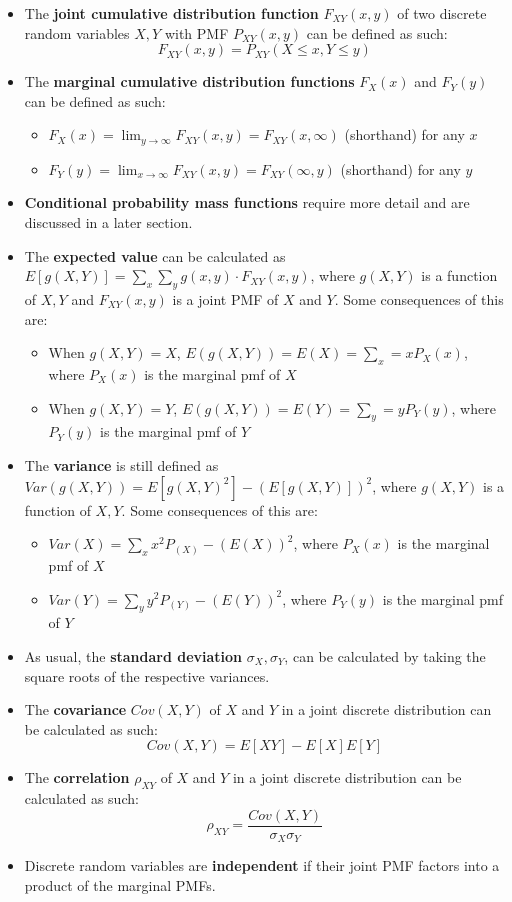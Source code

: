 \documentclass[12pt]{article}
\begin{document}
\begin{itemize}
	\item The \textbf{joint cumulative distribution function} $F_{XY}(x, y)$ of
	      two discrete random variables $X, Y$ with PMF $P_{XY}(x, y)$ can be defined as such:
	      \[
		      F_{XY}(x, y) = P_{XY}(X \leq x, Y \leq y)
	      \]
	\item The \textbf{marginal cumulative distribution functions} $F_X(x)$ and $F_Y(y)$ can be defined as such:
	      \begin{itemize}
		      \item $F_X(x) = \lim_{y\to\infty}F_{XY}(x, y) = F_{XY} (x, \infty)$ (shorthand) for any $x$
		      \item $F_Y(y) = \lim_{x\to\infty}F_{XY}(x, y) = F_{XY} (\infty, y)$ (shorthand) for any $y$
	      \end{itemize}
	\item \textbf{Conditional probability mass functions} require more detail and are discussed in a later section.
	\item The \textbf{expected value} can be calculated as $E[g(X, Y)] = \displaystyle\sum_{x}
		      \displaystyle\sum_{y} g(x, y) \cdot F_{XY}(x, y)$, where $g(X, Y)$ is a
	      function of $X, Y$ and $F_{XY}(x, y)$ is a joint PMF of $X$ and $Y$. Some consequences of this are:
	      \begin{itemize}
		      \item When $g(X, Y) = X$, $E(g(X, Y)) = E(X) = \displaystyle\sum_{x} = x P_X(x)$, where $P_X(x)$ is the marginal pmf of $X$
		      \item When $g(X, Y) = Y$, $E(g(X, Y)) = E(Y) = \displaystyle\sum_{y} = y P_Y(y)$, where $P_Y(y)$ is the marginal pmf of $Y$
	      \end{itemize}
	\item The \textbf{variance} is still defined as $Var(g(X, Y)) = E[g(X,
				      Y)^2] - (E[g(X, Y)])^2$, where $g(X, Y)$ is a function of $X, Y$. Some
	      consequences of this are:
	      \begin{itemize}
		      \item $Var(X) = \displaystyle\sum_{x} x^2 P_(X) - (E(X))^2$, where $P_X(x)$ is the marginal pmf of $X$
		      \item $Var(Y) = \displaystyle\sum_{y} y^2 P_(Y) - (E(Y))^2$, where $P_Y(y)$ is the marginal pmf of $Y$
	      \end{itemize}
	\item As usual, the \textbf{standard deviation} $\sigma_X, \sigma_Y$,
	      can be calculated by taking the square roots of the respective
	      variances.
	\item The \textbf{covariance} $Cov(X, Y)$ of $X$ and $Y$ in a joint discrete distribution can be calculated as such:
	      \[
		      Cov(X, Y) = E[XY] - E[X]E[Y]
	      \]
	\item The \textbf{correlation} $\rho_{XY}$ of $X$ and $Y$ in a joint discrete distribution can be calculated as such:
	      \[
		      \rho_{XY} = \frac{Cov(X, Y)}{\sigma_X \sigma_Y}
	      \]
	\item Discrete random variables are \textbf{independent} if their joint PMF factors into a product of the marginal PMFs.
\end{itemize}
\end{document}

